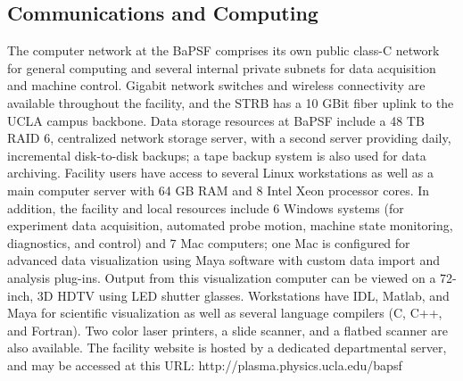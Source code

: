 \documentclass[11pt]{article}
\begin{document}
 \subsection{Communications and Computing}
The computer network at the BaPSF comprises its own public class-C network for general computing and several internal private subnets for data acquisition and machine control. Gigabit network switches and wireless connectivity are available throughout the facility, and the STRB has a 10 GBit fiber uplink to the UCLA campus backbone. 
	Data storage resources at BaPSF include a 48 TB RAID 6, centralized network storage server, with a second server providing daily, incremental disk-to-disk backups; a tape backup system is also used for data archiving. Facility users have access to several Linux workstations as well as a main computer server with 64 GB RAM and 8 Intel Xeon processor cores. In addition, the facility and local resources include 6 Windows systems (for experiment data acquisition, automated probe motion, machine state monitoring, diagnostics, and control) and 7 Mac computers; one Mac is configured for advanced data visualization using Maya software with custom data import and analysis plug-ins. Output from this visualization computer can be viewed on a 72-inch, 3D HDTV using LED shutter glasses. Workstations have IDL, Matlab, and Maya for scientific visualization as well as several language compilers (C, C++, and Fortran). Two color laser printers, a slide scanner, and a flatbed scanner are also available.  The facility website is hosted by a dedicated departmental server, and may be accessed at this URL: http://plasma.physics.ucla.edu/bapsf



%
%
%
%  
\end{document}
